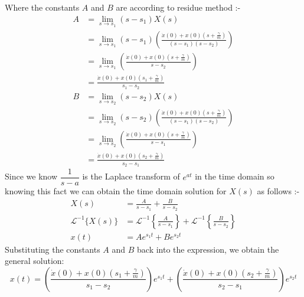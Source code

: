\documentclass[10pt,twoside]{report}
\begin{document}
Where the constants $A$ and $B$ are according to residue method :-
\begin{align*}
    A &= \lim_{s \to s_1} (s - s_1) X(s) \\
      &= \lim_{s \to s_1} (s - s_1)\left(\frac{\dot{x}(0) + x(0) \left( s + \frac{\gamma}{m} \right)}{(s - s_1)(s - s_2)}\right)\\
      &=\lim_{s \to s_1}\left(\frac{\dot{x}(0) + x(0) \left( s + \frac{\gamma}{m} \right)}{s - s_2}\right)\\
      &=\frac{\dot{x}(0) + x(0) \left( s_1 + \frac{\gamma}{m} \right)}{s_1 - s_2}\\
    B &= \lim_{s \to s_2} (s - s_2) X(s)\\
      &= \lim_{s \to s_2} (s - s_2)\left(\frac{\dot{x}(0) + x(0) \left( s + \frac{\gamma}{m} \right)}{(s - s_1)(s - s_2)}\right)\\
      &=\lim_{s \to s_2}\left(\frac{\dot{x}(0) + x(0) \left( s + \frac{\gamma}{m} \right)}{s - s_1}\right)\\
      &=\frac{\dot{x}(0) + x(0) \left( s_2 + \frac{\gamma}{m} \right)}{s_2 - s_1}
\end{align*}
Since we know $\dfrac{1}{s-a}$ is the Laplace transform of $e^{at}$ in the time domain so knowing this fact we can obtain the time domain solution for $X(s)$ as follows :-
\begin{align*}
    X(s) &= \frac{A}{s - s_1} + \frac{B}{s - s_2} \\[10pt]
    \mathcal{L}^{-1} \{ X(s) \} &= \mathcal{L}^{-1} \left\{ \frac{A}{s - s_1} \right\} + \mathcal{L}^{-1} \left\{ \frac{B}{s - s_2} \right\} \\[10pt]
    x(t) &= A e^{s_1 t} + B e^{s_2 t}
\end{align*}
Substituting the constants $A$ and $B$ back into the expression, we obtain the general solution:
\begin{equation}
\label{eq:solution_FDO}
    x(t) = \left( \frac{\dot{x}(0) + x(0) ( s_1 + \frac{\gamma}{m} )}{s_1 - s_2} \right) e^{s_1 t} + \left( \frac{\dot{x}(0) + x(0) ( s_2 + \frac{\gamma}{m} )}{s_2 - s_1} \right) e^{s_2 t}
\end{equation}
\end{document}
